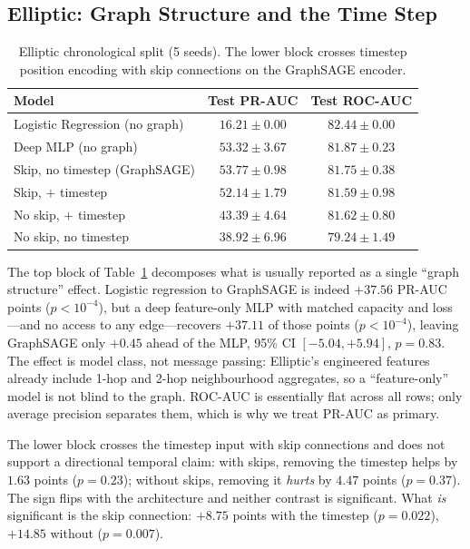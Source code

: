 \documentclass[conference]{IEEEtran}
\begin{document}
\subsection{Elliptic: Graph Structure and the Time Step}
\label{sec:temporal}

\begin{table}[t]
\caption{Elliptic chronological split (5 seeds). The lower block crosses
timestep position encoding with skip connections on the GraphSAGE encoder.}
\label{tab:elliptic}
\centering
\footnotesize
\setlength{\tabcolsep}{3pt}
\begin{tabular}{lcc}
\toprule
\textbf{Model} & \textbf{Test PR-AUC} & \textbf{Test ROC-AUC} \\
\midrule
Logistic Regression (no graph) & $16.21 \pm 0.00$ & $82.44 \pm 0.00$ \\
Deep MLP (no graph) & $53.32 \pm 3.67$ & $81.87 \pm 0.23$ \\
\midrule
Skip, no timestep (GraphSAGE) & $\mathbf{53.77 \pm 0.98}$ & $81.75 \pm 0.38$ \\
Skip, $+$ timestep & $52.14 \pm 1.79$ & $81.59 \pm 0.98$ \\
No skip, $+$ timestep & $43.39 \pm 4.64$ & $81.62 \pm 0.80$ \\
No skip, no timestep & $38.92 \pm 6.96$ & $79.24 \pm 1.49$ \\
\bottomrule
\end{tabular}
\end{table}

The top block of Table~\ref{tab:elliptic} decomposes what is usually reported
as a single ``graph structure'' effect. Logistic regression to GraphSAGE is
indeed $+37.56$ PR-AUC points ($p<10^{-4}$), but a deep feature-only MLP with
matched capacity and loss---and no access to any edge---recovers $+37.11$ of
those points ($p<10^{-4}$), leaving GraphSAGE only $+0.45$ ahead of the MLP,
95\% CI $[-5.04, +5.94]$, $p=0.83$. The effect is model class, not message
passing: Elliptic's engineered features already include 1-hop and 2-hop
neighbourhood aggregates, so a ``feature-only'' model is not blind to the
graph. ROC-AUC is essentially flat across all rows; only average precision
separates them, which is why we treat PR-AUC as primary.

The lower block crosses the timestep input with skip connections and does not
support a directional temporal claim: with skips, removing the timestep helps
by $1.63$ points ($p=0.23$); without skips, removing it \emph{hurts} by
$4.47$ points ($p=0.37$). The sign flips with the architecture and neither
contrast is significant. What \emph{is} significant is the skip connection:
$+8.75$ points with the timestep ($p=0.022$), $+14.85$ without ($p=0.007$).
\end{document}

